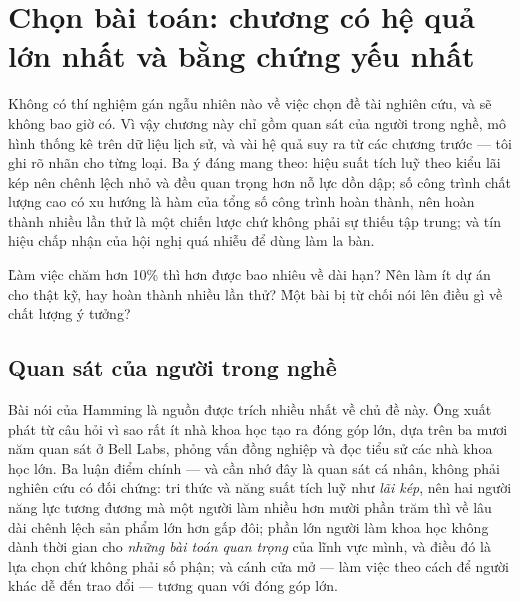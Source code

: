 \documentclass[../hieu-suat.tex]{subfiles}
\begin{document}
\chapter{Chọn bài toán: chương có hệ quả lớn nhất và bằng chứng yếu nhất}

\begin{tomtat}
Không có thí nghiệm gán ngẫu nhiên nào về việc chọn đề tài nghiên cứu, và sẽ không bao giờ có. Vì vậy chương này chỉ gồm quan sát của người trong nghề, mô hình thống kê trên dữ liệu lịch sử, và vài hệ quả suy ra từ các chương trước --- tôi ghi rõ nhãn cho từng loại. Ba ý đáng mang theo: hiệu suất tích luỹ theo kiểu lãi kép nên chênh lệch nhỏ và đều quan trọng hơn nỗ lực dồn dập; số công trình chất lượng cao có xu hướng là hàm của tổng số công trình hoàn thành, nên hoàn thành nhiều lần thử là một chiến lược chứ không phải sự thiếu tập trung; và tín hiệu chấp nhận của hội nghị quá nhiễu để dùng làm la bàn.
\end{tomtat}

\begin{khoigoi}
\h{Làm việc chăm hơn 10\% thì hơn được bao nhiêu về dài hạn?}
\h{Nên làm ít dự án cho thật kỹ, hay hoàn thành nhiều lần thử?}
\h{Một bài bị từ chối nói lên điều gì về chất lượng ý tưởng?}
\end{khoigoi}

\section{Quan sát của người trong nghề}

Bài nói của Hamming \cite{hamming1986} là nguồn được trích nhiều nhất về chủ đề này. Ông xuất phát từ câu hỏi vì sao rất ít nhà khoa học tạo ra đóng góp lớn, dựa trên ba mươi năm quan sát ở Bell Labs, phỏng vấn đồng nghiệp và đọc tiểu sử các nhà khoa học lớn. Ba luận điểm chính \nT{} --- và cần nhớ đây là quan sát cá nhân, không phải nghiên cứu có đối chứng: tri thức và năng suất tích luỹ như \emph{lãi kép}, nên hai người năng lực tương đương mà một người làm nhiều hơn mười phần trăm thì về lâu dài chênh lệch sản phẩm lớn hơn gấp đôi; phần lớn người làm khoa học không dành thời gian cho \emph{những bài toán quan trọng} của lĩnh vực mình, và điều đó là lựa chọn chứ không phải số phận; và cánh cửa mở --- làm việc theo cách để người khác dễ đến trao đổi --- tương quan với đóng góp lớn.
\end{document}
